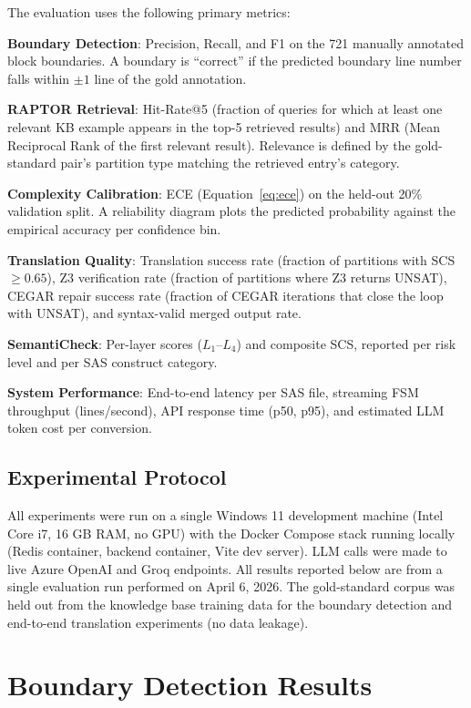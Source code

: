 The evaluation uses the following primary metrics:

\textbf{Boundary Detection}: Precision, Recall, and F1 on the 721 manually
annotated block boundaries. A boundary is ``correct'' if the predicted boundary
line number falls within $\pm 1$ line of the gold annotation.

\textbf{RAPTOR Retrieval}: Hit-Rate@5 (fraction of queries for which at least
one relevant KB example appears in the top-5 retrieved results) and MRR
(Mean Reciprocal Rank of the first relevant result). Relevance is defined by
the gold-standard pair's partition type matching the retrieved entry's category.

\textbf{Complexity Calibration}: ECE (Equation~\ref{eq:ece}) on the held-out
20\% validation split. A reliability diagram plots the predicted probability
against the empirical accuracy per confidence bin.

\textbf{Translation Quality}: Translation success rate (fraction of partitions
with SCS $\geq 0.65$), Z3 verification rate (fraction of partitions where Z3
returns UNSAT), CEGAR repair success rate (fraction of CEGAR iterations that
close the loop with UNSAT), and syntax-valid merged output rate.

\textbf{SemantiCheck}: Per-layer scores ($L_1$--$L_4$) and composite SCS,
reported per risk level and per SAS construct category.

\textbf{System Performance}: End-to-end latency per SAS file, streaming FSM
throughput (lines/second), API response time (p50, p95), and estimated LLM
token cost per conversion.

\subsection{Experimental Protocol}
\label{subsec:experimental-protocol}

All experiments were run on a single Windows 11 development machine (Intel Core
i7, 16 GB RAM, no GPU) with the Docker Compose stack running locally (Redis
container, backend container, Vite dev server). LLM calls were made to live
Azure OpenAI and Groq endpoints. All results reported below are from a single
evaluation run performed on April 6, 2026. The gold-standard corpus was held
out from the knowledge base training data for the boundary detection and
end-to-end translation experiments (no data leakage).

\section{Boundary Detection Results}
\label{sec:boundary-results}

